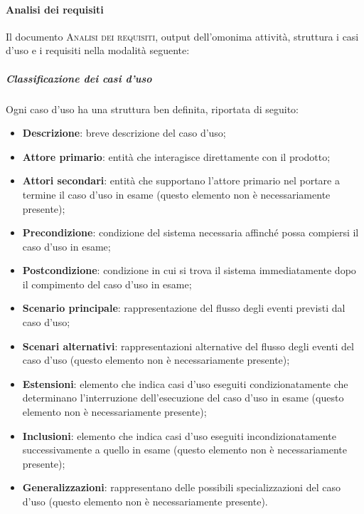 \paragraph{Analisi dei requisiti}
\label{par:analisi_dei_requisiti}
Il documento \textsc{Analisi dei requisiti}, output dell'omonima attività, struttura i casi d'uso e i requisiti nella modalità seguente:
\subparagraph{Classificazione dei casi d'uso}
\label{par:classificazione_casi_duso}
Ogni caso d'uso ha una struttura ben definita, riportata di seguito:
\begin{itemize}
    \item \textbf{Descrizione}: breve descrizione del caso d'uso;
    \item \textbf{Attore primario}: entità che interagisce direttamente con il prodotto;
    \item \textbf{Attori secondari}: entità che supportano l'attore primario nel portare a termine il caso d'uso in
    	esame (questo elemento non è necessariamente presente);
    \item \textbf{Precondizione}: condizione del sistema necessaria affinché possa compiersi il caso d'uso in esame;
    \item \textbf{Postcondizione}: condizione in cui si trova il sistema immediatamente dopo il compimento del caso
    d'uso in esame;
    \item \textbf{Scenario principale}: rappresentazione del flusso degli eventi previsti dal caso d'uso;
    \item \textbf{Scenari alternativi}: rappresentazioni alternative del flusso degli eventi del caso d'uso (questo
    	elemento non è necessariamente presente);
    \item \textbf{Estensioni}: elemento che indica casi d'uso eseguiti condizionatamente che determinano l'interruzione
    	dell'esecuzione del caso d'uso in esame (questo elemento non è necessariamente presente);
    \item \textbf{Inclusioni}: elemento che indica casi d'uso eseguiti incondizionatamente successivamente a quello in
    	esame (questo elemento non è necessariamente presente);
    \item \textbf{Generalizzazioni}: rappresentano delle possibili specializzazioni del caso d'uso (questo elemento non è necessariamente
    	presente).
\end{itemize}

